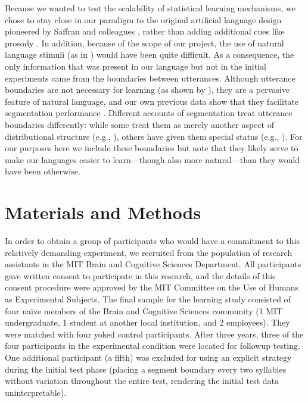 \documentclass[10pt]{article}
\begin{document}
Because we wanted to test the scalability of statistical learning mechanisms, we chose to stay close in our paradigm to the original artificial language design pioneered by Saffran and colleagues \cite{saffran1996b}, rather than adding additional cues like prosody \cite{hay2011b}. In addition, because of the scope of our project, the use of natural language stimuli (as in \cite{pelucchi2009}) would have been quite difficult. As a consequence, the only information that was present in our language but not in the initial experiments came from the boundaries between utterances. Although utterance boundaries are not necessary for learning (as shown by \cite{saffran1996b}), they are a pervasive feature of natural language, and our own previous data show that they facilitate segmentation performance \cite{frank2010}. Different accounts of segmentation treat utterance boundaries differently: while some treat them as merely another aspect of distributional structure (e.g., \cite{goldwater2009}), others have given them special status (e.g., \cite{aslin1996}). For our purposes here we include these boundaries but note that they likely serve to make our languages easier to learn---though also more natural---than they would have been otherwise.

\section*{Materials and Methods}

In order to obtain a group of participants who would have a commitment to this relatively demanding experiment, we recruited from the population of research assistants in the MIT Brain and Cognitive Sciences Department. All participants gave written consent to participate in this research, and the details of this consent procedure were approved by the MIT Committee on the Use of Humans as Experimental Subjects. The final sample for the learning study consisted of four na\"ive members of the Brain and Cognitive Sciences community (1 MIT undergraduate, 1 student at another local institution, and 2 employees). They were matched with four yoked control participants. After three years, three of the four participants in the experimental condition were located for followup testing. One additional participant (a fifth) was excluded for using an explicit strategy during the initial test phase (placing a segment boundary every two syllables without variation throughout the entire test, rendering the initial test data uninterpretable). 
\end{document}
